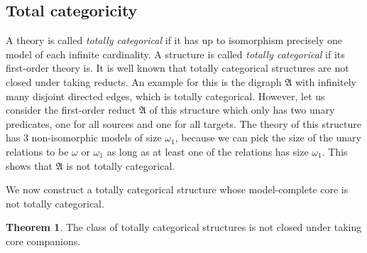 \documentclass{amsart}
\theoremstyle{definition}
\newtheorem{theorem}{Theorem}[section]
\theoremstyle{remark}
\numberwithin{equation}{section}
\newcommand{\fa}{\mathfrak{A}}
\begin{document}
\subsection{Total categoricity}
A theory is called \emph{totally categorical} if it has up to isomorphism precisely one model of each infinite cardinality.
A structure is called \emph{totally categorical} if its first-order theory is. 
	It is well known that totally categorical structures are not closed under taking reducts. An example for this is the digraph $\fa$ with infinitely many disjoint directed edges, which is totally categorical. However, let us consider the first-order reduct $\fa$ of this structure which only has two unary predicates, one for all sources and one for all targets. The theory of this structure has 3 non-isomorphic models of size $\omega_1$, because we can pick the size of the unary relations to be $\omega$ or $\omega_1$ as long as at least one of the relations has size $\omega_1$. This shows that $\fa$ is not totally categorical. 

    We now construct a totally categorical structure whose model-complete core is not
    totally categorical.
    
\begin{theorem}\label{thm:total_mc}
    The class of totally categorical structures is not closed under taking core companions.
\end{theorem}
\end{document}
